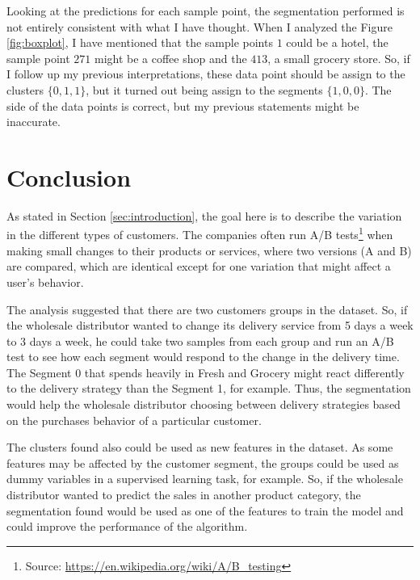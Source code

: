 \documentclass[a4paper]{article}
\begin{document}
Looking at the predictions for each sample point, the segmentation performed is not entirely consistent with what I have thought. When I analyzed the Figure \ref{fig:boxplot}, I have mentioned that the sample points $1$ could be a hotel, the sample point $271$ might be a coffee shop and the $413$, a small grocery store. So, if I follow up my previous interpretations, these data point should be assign to the clusters $\{ 0, 1, 1\}$, but it turned out being assign to the segments $\{ 1, 0, 0\}$. The side of the data points is correct, but my previous statements might be inaccurate.


\section{Conclusion}
\label{sec:conclusion}

As stated in Section \ref{sec:introduction}, the goal here is to describe the variation in the different types of customers. The companies often run A/B tests\footnote{Source: \url{https://en.wikipedia.org/wiki/A/B_testing}} when making small changes to their products or services, where two versions (A and B) are compared, which are identical except for one variation that might affect a user's behavior.

The analysis suggested that there are two customers groups in the dataset. So, if the wholesale distributor wanted to change its delivery service from 5 days a week to 3 days a week, he could take two samples from each group and run an A/B test to see how each segment would respond to the change in the delivery time. The Segment 0 that spends heavily in Fresh and Grocery might react differently to the delivery strategy than the Segment 1, for example. Thus, the segmentation would help the wholesale distributor choosing between delivery strategies based on the purchases behavior of a particular customer.

The clusters found also could be used as new features in the dataset. As some features may be affected by the customer segment, the groups could be used as dummy variables in a supervised learning task, for example. So, if the wholesale distributor wanted to predict the sales in another product category, the segmentation found would be used as one of the features to train the model and could improve the performance of the algorithm.
\end{document}
